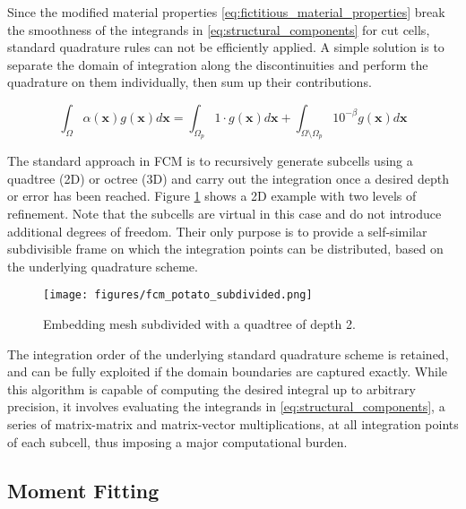 Since the modified material properties \ref{eq:fictitious_material_properties} break the smoothness of the integrands in \ref{eq:structural_components} for cut cells, standard quadrature rules can not be efficiently applied. A simple solution is to separate the domain of integration along the discontinuities and perform the quadrature on them individually, then sum up their contributions.

\begin{equation}
	\int_{\Omega} \alpha (\mathbf x) g(\mathbf x) d\mathbf x=
	\int_{\Omega_p} 1 \cdot g(\mathbf x) d\mathbf x
	+
	\int_{\Omega \setminus \Omega_p} 10^{-\beta} g(\mathbf x) d\mathbf x
\end{equation}

 The standard approach in FCM is to recursively generate subcells using a quadtree (2D) or octree (3D) and carry out the integration once a desired depth or error has been reached. Figure \ref{fig:fcm_potato_partitioned} shows a 2D example with two levels of refinement. Note that the subcells are virtual in this case and do not introduce additional degrees of freedom. Their only purpose is to provide a self-similar subdivisible frame on which the integration points can be distributed, based on the underlying quadrature scheme.

\begin{figure}[h]
	\centering
	\texttt{[image: figures/fcm\_potato\_subdivided.png]}
	\caption{Embedding mesh subdivided with a quadtree of depth 2.}
	\label{fig:fcm_potato_partitioned}
\end{figure}

The integration order of the underlying standard quadrature scheme is retained, and can be fully exploited if the domain boundaries are captured exactly. While this algorithm is capable of computing the desired integral up to arbitrary precision, it involves evaluating the integrands in \ref{eq:structural_components}, a series of matrix-matrix and matrix-vector multiplications, at all integration points of each subcell, thus imposing a major computational burden.

\subsection*{Moment Fitting}
\label{subsection:moment_fitting}


